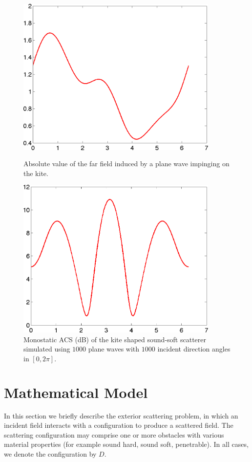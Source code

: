 \documentclass[12pt,letterpaper,final]{article}
\begin{document}
\begin{figure}
\centering
\includegraphics[width=10cm]{kite_far_field}
\caption{\label{fig:kite_far_field}
Absolute value of the far field induced by a plane wave   impinging  on the kite.}

\vspace{0.3in}
\includegraphics[width=10cm]{kite_monostatic_lowfreq_new_cartesian}
\caption{\label{fig:kite_monostatic}
Monostatic ACS  (dB) of the  kite shaped sound-soft scatterer 
simulated using $1000$ plane waves
with $1000$ incident direction angles in $[0, 2  \pi]$. }
\end{figure}

\newpage
\section{Mathematical Model}\label{sec:model}

In this section we briefly describe the exterior scattering problem,
in which an incident field interacts with a configuration to produce a scattered field.
The scattering configuration may comprise one or more obstacles 
with various material properties (for example sound hard, sound soft,
penetrable). In all cases, we denote the configuration by $D$. 
\end{document}
